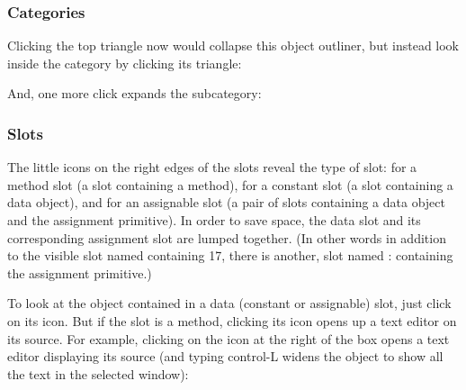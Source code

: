 \documentclass[letterpaper,10pt,english]{sphinxmanual}
\begin{document}
\subsubsection{Categories}
\label{\detokenize{howtoprg:categories}}
Clicking the top triangle now would collapse this object outliner, but instead look inside the category
by clicking its triangle:
\begin{figure}[htbp]
\centering

\noindent{}
\end{figure}

And, one more click expands the subcategory:
\begin{figure}[htbp]
\centering

\noindent{}
\end{figure}


\subsubsection{Slots}
\label{\detokenize{howtoprg:slots}}
The little icons on the right edges of the slots reveal the type of slot:  for a method slot (a slot
containing a method),  for a constant slot (a slot containing a data object), and  for an assignable
slot (a pair of slots containing a data object and the assignment primitive). In order to save
space, the data slot and its corresponding assignment slot are lumped together. (In other words in
addition to the visible slot named  containing 17, there is another, 
slot named : containing the assignment primitive.)

To look at the object contained in a data (constant or assignable) slot, just click on its icon. But if
the slot is a method, clicking its icon opens up a text editor on its source. For example, clicking on
the icon at the right of the  box opens a text editor displaying its source (and typing control-L
widens the object to show all the text in the selected window):
\begin{figure}[htbp]
\centering

\noindent{}
\end{figure}
\newpage
\end{document}
